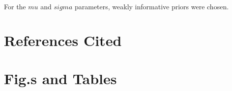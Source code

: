 \documentclass[11pt]{article}
\begin{document}
For the $mu$ and $sigma$ parameters, weakly informative priors were chosen.


\section*{References Cited}





\newpage
\section*{Fig.s and Tables}

\end{document}
